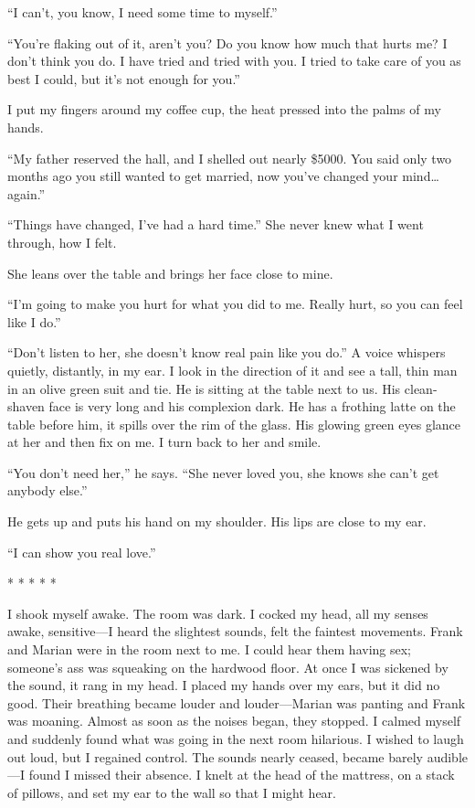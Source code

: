 ``I can't, you know, I need some time to myself.''

``You're flaking out of it, aren't you? Do you know how much that hurts
me? I don't think you do. I have tried and tried with you. I tried to
take care of you as best I could, but it's not enough for you.''

I put my fingers around my coffee cup, the heat pressed into the palms
of my hands.

``My father reserved the hall, and I shelled out nearly \$5000. You said
only two months ago you still wanted to get married, now you've changed
your mind\ldots again.''

``Things have changed, I've had a hard time.'' She never knew what I
went through, how I felt.

She leans over the table and brings her face close to mine.

``I'm going to make you hurt for what you did to me. Really hurt, so you
can feel like I do.''

``Don't listen to her, she doesn't know real pain like you do.'' A voice
whispers quietly, distantly, in my ear. I look in the direction of it
and see a tall, thin man in an olive green suit and tie. He is sitting
at the table next to us. His clean-shaven face is very long and his
complexion dark. He has a frothing latte on the table before him, it
spills over the rim of the glass. His glowing green eyes glance at her
and then fix on me. I turn back to her and smile.

``You don't need her,'' he says. ``She never loved you, she knows she
can't get anybody else.''

He gets up and puts his hand on my shoulder. His lips are close to my
ear.

``I can show you real love.''

* * * * *

I shook myself awake. The room was dark. I cocked my head, all my senses
awake, sensitive---I heard the slightest sounds, felt the faintest
movements. Frank and Marian were in the room next to me. I could hear
them having sex; someone's ass was squeaking on the hardwood floor. At
once I was sickened by the sound, it rang in my head. I placed my hands
over my ears, but it did no good. Their breathing became louder and
louder---Marian was panting and Frank was moaning. Almost as soon as the
noises began, they stopped. I calmed myself and suddenly found what was
going in the next room hilarious. I wished to laugh out loud, but I
regained control. The sounds nearly ceased, became barely audible---I
found I missed their absence. I knelt at the head of the mattress, on a
stack of pillows, and set my ear to the wall so that I might hear.

